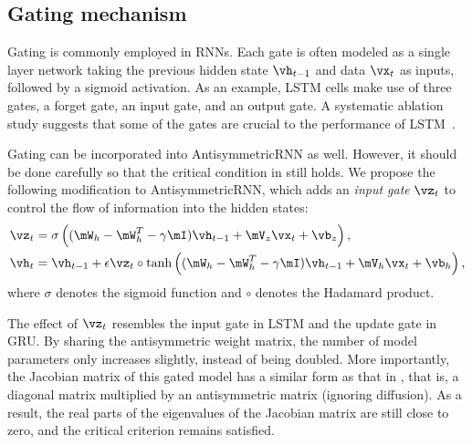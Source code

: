 \subsection{Gating mechanism}
\label{sec:gating_mechanism}

Gating is commonly employed in RNNs.
Each gate is often modeled as a single layer network taking the previous hidden state $\vh_{t-1}$ and data $\vx_t$ as inputs, followed by a sigmoid activation.
As an example, LSTM cells make use of three gates, a forget gate, an input gate, and an output gate.
A systematic ablation study suggests that some of the gates are crucial to the performance of LSTM~\citep{jozefowicz2015empirical}.


Gating can be incorporated into AntisymmetricRNN as well.
However, it should be done carefully so that the critical condition in  still holds.
We propose the following modification to AntisymmetricRNN, which adds an \textit{input gate} $\vz_t$ to control the flow of information into the hidden states: 
\begin{align}
    \vz_{t} &=  \sigma 
    \left(
    (\mW_h - \mW_h^T - \gamma \mI) \vh_{t-1} + \mV_{z} \vx_{t} + \vb_{z} 
    \right), 
    \nonumber
    \\
    \label{eq:antisymm_RNN_gating}
    \vh_{t}
    &=
    \vh_{t-1}
    +
    \epsilon
    \vz_{t}
    \circ
    \tanh\left((\mW_h - \mW_h^T - \gamma \mI) \vh_{t-1} + \mV_h \vx_{t} + \vb_h \right),
\end{align}
where $\sigma$ denotes the sigmoid function and $\circ$ denotes the Hadamard product.


The effect of $\vz_t$ resembles the input gate in LSTM and the update gate in GRU.
By sharing the antisymmetric weight matrix, the number of model parameters only increases slightly, instead of being doubled.
More importantly, the Jacobian matrix of this gated model has a similar form as that in , that is, a diagonal matrix multiplied by an antisymmetric matrix (ignoring diffusion).
As a result, the real parts of the eigenvalues of the Jacobian matrix are still close to zero, and the critical criterion remains satisfied.

